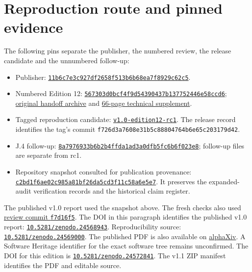 \documentclass[11pt,letterpaper]{article}
\theoremstyle{definition}\newtheorem{definition}[theorem]{Definition}\newtheorem{example}[theorem]{Example}
\theoremstyle{remark}\newtheorem{remark}[theorem]{Remark}
\newcommand{\aud}[2]{\href{https://github.com/nousentllc/VP-VNP-Review/blob/567303d0bcf4f9d54390437b137752446e58ccd6/#1}{#2}}
\begin{document}
\section{Reproduction route and pinned evidence}\label{sec:repro}
The following pins separate the publisher, the numbered review, the release candidate and the unnumbered follow-up:
\begin{itemize}[leftmargin=1.7em]
\item Publisher: \href{https://github.com/anthropics/formal-math/tree/11b6c7e3c927df2658f513b6b68ea7f8929c62c5/vp-vnp}{\nolinkurl{11b6c7e3c927df2658f513b6b68ea7f8929c62c5}}.
\item Numbered Edition 12: \href{https://github.com/nousentllc/VP-VNP-Review/tree/567303d0bcf4f9d54390437b137752446e58ccd6}{\nolinkurl{567303d0bcf4f9d54390437b137752446e58ccd6}}; \aud{handoff/VP_VNP_Review_2026-11-25_pass15.zip}{original handoff archive} and \aud{report/VP_VNP_Research_Review.pdf}{66-page technical supplement}.
\item Tagged reproduction candidate: \href{https://github.com/nousentllc/VP-VNP-Review/tree/f726d3a7608e31b5c88804764b6e65c203179d42}{\texttt{v1.0-edition12-rc1}}. The release record identifies the tag's commit \nolinkurl{f726d3a7608e31b5c88804764b6e65c203179d42}.
\item J.4 follow-up: \href{https://github.com/nousentllc/VP-VNP-Review/tree/8a7976933b6b2b4ffda1ad3a0dfb5fc6b6f023e8}{\nolinkurl{8a7976933b6b2b4ffda1ad3a0dfb5fc6b6f023e8}}; follow-up files are separate from rc1.
\item Repository snapshot consulted for publication provenance: \href{https://github.com/nousentllc/VP-VNP-Review/tree/c2bd1f6ae02c985a81bf26da5cd3f11c58a6e5e7}{\nolinkurl{c2bd1f6ae02c985a81bf26da5cd3f11c58a6e5e7}}. It preserves the expanded-audit verification records and the historical claim register.\end{itemize}
The published v1.0 report used the snapshot above. The fresh checks also used \href{https://github.com/nousentllc/VP-VNP-Review/tree/f7d16f5fd48ac0ffcfe50c3828778dc7c97a27c3}{review commit \texttt{f7d16f5}}. The DOI in this paragraph identifies the published v1.0 report: \href{https://doi.org/10.5281/zenodo.24568943}{\nolinkurl{10.5281/zenodo.24568943}}. Reproducibility source: \href{https://doi.org/10.5281/zenodo.24569000}{\nolinkurl{10.5281/zenodo.24569000}}. The published PDF is also available on \href{https://www.alphaxiv.org/abs/2611.lean-vp-vnp-formalization-audit}{alphaXiv}. A Software Heritage identifier for the exact software tree remains unconfirmed. The DOI for this edition is \href{https://doi.org/10.5281/zenodo.24572841}{\nolinkurl{10.5281/zenodo.24572841}}. The v1.1 ZIP manifest identifies the PDF and editable source.
\end{document}
